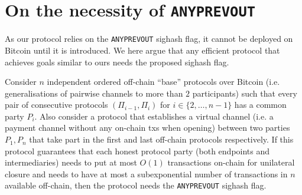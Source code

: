 \section{On the necessity of \texttt{ANYPREVOUT}}
  \label{section:anyprevout}
  As our protocol relies on the \texttt{ANYPREVOUT} sighash flag, it cannot be
  deployed on Bitcoin until it is introduced. We here argue that any efficient
  protocol that achieves goals similar to ours needs the proposed sighash flag.

  \begin{theorem}
    \label{theorem:anyprevout}
    Consider $n$ independent ordered off-chain ``base'' protocols over Bitcoin
    (i.e. generalisations of pairwise channels to more than $2$ participants)
    such that every pair of consecutive protocols $(\Pi_{i-1}, \Pi_i)$ for $i
    \in \{2, \dots, n-1\}$ has a common party $P_i$. Also consider a protocol
    that establishes a virtual channel (i.e. a payment channel without any on-chain
    txs when opening) between two parties $P_1, P_n$ that take part in the first
    and last off-chain protocols respectively. If this protocol guarantees that
    each honest protocol party (both endpoints and intermediaries) needs to put
    at most $O(1)$ transactions on-chain for unilateral closure and needs to
    have at most a subexponential number of transactions in $n$ available off-chain,
    then the protocol needs the \texttt{ANYPREVOUT} sighash flag.
  \end{theorem}

